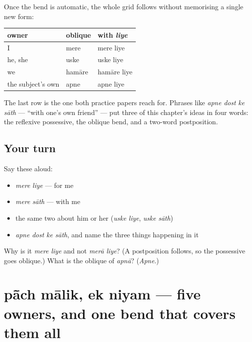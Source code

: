 \begin{grammarlens}[title={Grammar Lens: the pattern generalises to every person}]
Once the bend is automatic, the whole grid follows without memorising a single new form:

\noindent
\begin{tabularx}{\linewidth}{@{}>{\raggedright\arraybackslash}X>{\raggedright\arraybackslash}X>{\raggedright\arraybackslash}X@{}}
\toprule
\textbf{owner} & \textbf{oblique} & \textbf{with \emph{liye}} \\
\midrule
I & mere & mere liye \\
he, she & uske & uske liye \\
we & hamāre & hamāre liye \\
the subject's own & apne & apne liye \\
\bottomrule
\end{tabularx}

The last row is the one both practice papers reach for. Phrases like \emph{apne dost ke sāth} — \textquotedblleft{}with one's own friend\textquotedblright{} — put three of this chapter's ideas in four words: the reflexive possessive, the oblique bend, and a two-word postposition.
\end{grammarlens}

\subsection*{Your turn}
Say these aloud:

\begin{itemize}
\raggedright
  \item \emph{mere liye} — for me
  \item \emph{mere sāth} — with me
  \item the same two about him or her (\emph{uske liye}, \emph{uske sāth})
  \item \emph{apne dost ke sāth}, and name the three things happening in it
\end{itemize}

\begin{tcolorbox}[breakable,colback=teal!4,colframe=teal!35!black,title={Before you move on}]
Why is it \emph{mere liye} and not \emph{merā liye}? (A postposition follows, so the possessive goes oblique.) What is the oblique of \emph{apnā}? (\emph{Apne}.)
\end{tcolorbox}
\section[\texorpdfstring{\hi{पाँच} \hi{मालिक}, \hi{एक} \hi{नियम} (pā̃ch mālik, ek …)}{पाँच मालिक, एक नियम (pā̃ch mālik, ek …)}]{pā̃ch mālik, ek niyam — five owners, and one bend that covers them all}

